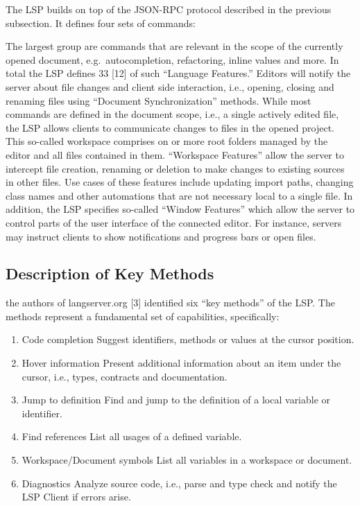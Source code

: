 \documentclass[
  a4paper,
  bibtex,
  english,
  nomenclature]{kthlatex/kththesis/kththesis}
\providecommand{\tightlist}{%
  \setlength{\itemsep}{0pt}\setlength{\parskip}{0pt}}
\begin{document}
The LSP builds on top of the JSON-RPC protocol described in the previous
subsection. It defines four sets of commands:

The largest group are commands that are relevant in the scope of the
currently opened document, e.g.~autocompletion, refactoring, inline
values and more. In total the LSP defines 33 {[}12{]} of such ``Language
Features.'' Editors will notify the server about file changes and client
side interaction, i.e., opening, closing and renaming files using
``Document Synchronization'' methods. While most commands are defined in
the document scope, i.e., a single actively edited file, the LSP allows
clients to communicate changes to files in the opened project. This
so-called workspace comprises on or more root folders managed by the
editor and all files contained in them. ``Workspace Features'' allow the
server to intercept file creation, renaming or deletion to make changes
to existing sources in other files. Use cases of these features include
updating import paths, changing class names and other automations that
are not necessary local to a single file. In addition, the LSP specifies
so-called ``Window Features'' which allow the server to control parts of
the user interface of the connected editor. For instance, servers may
instruct clients to show notifications and progress bars or open files.

\hypertarget{sec:description-of-key-methods}{%
\subsection{Description of Key
Methods}\label{sec:description-of-key-methods}}

the authors of langserver.org {[}3{]} identified six ``key methods'' of
the LSP. The methods represent a fundamental set of capabilities,
specifically:

\begin{enumerate}
\def\labelenumi{\arabic{enumi}.}
\tightlist
\item
  Code completion Suggest identifiers, methods or values at the cursor
  position.
\item
  Hover information Present additional information about an item under
  the cursor, i.e., types, contracts and documentation.
\item
  Jump to definition Find and jump to the definition of a local variable
  or identifier.
\item
  Find references List all usages of a defined variable.
\item
  Workspace/Document symbols List all variables in a workspace or
  document.
\item
  Diagnostics Analyze source code, i.e., parse and type check and notify
  the LSP Client if errors arise.
\end{enumerate}
\end{document}
